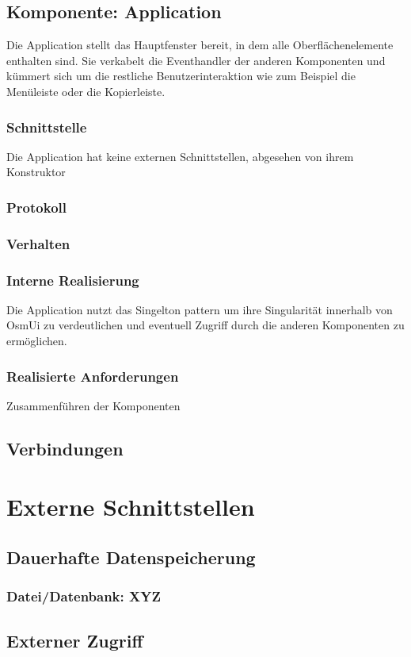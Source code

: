 \documentclass[a4paper,12pt]{scrartcl}
\begin{document}
\subsection{Komponente: Application}
Die Application stellt das Hauptfenster bereit, in dem alle Oberflächenelemente enthalten sind.
Sie verkabelt die Eventhandler der anderen Komponenten und kümmert sich um die restliche Benutzerinteraktion wie zum Beispiel die Menüleiste oder die Kopierleiste.
\subsubsection{Schnittstelle}
Die Application hat keine externen Schnittstellen, abgesehen von ihrem Konstruktor
\subsubsection{Protokoll}
\subsubsection{Verhalten}
\subsubsection{Interne Realisierung}
Die Application nutzt das Singelton pattern um ihre Singularität innerhalb von OsmUi zu verdeutlichen und eventuell Zugriff durch die anderen Komponenten zu ermöglichen.
\subsubsection{Realisierte Anforderungen}
Zusammenführen der Komponenten


\subsection{Verbindungen}
\section{Externe Schnittstellen}
\subsection{Dauerhafte Datenspeicherung}
\subsubsection{Datei/Datenbank: XYZ}
\subsection{Externer Zugriff}
\end{document}
